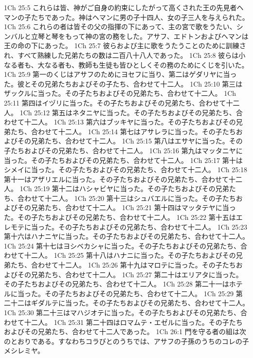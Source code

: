 1Ch 25:5  これらは皆、神がご自身の約束にしたがって高くされた王の先見者ヘマンの子たちであった。神はヘマンに男の子十四人、女の子三人を与えられた。
1Ch 25:6  これらの者は皆その父の指揮の下にあって、主の宮で歌をうたい、シンバルと立琴と琴をもって神の宮の務をした。アサフ、エドトンおよびヘマンは王の命の下にあった。
1Ch 25:7  彼らおよび主に歌をうたうことのために訓練され、すべて熟練した兄弟たちの数は二百八十八人であった。
1Ch 25:8  彼らは小なる者も、大なる者も、教師も生徒も皆ひとしくその務のためにくじを引いた。
1Ch 25:9  第一のくじはアサフのためにヨセフに当り、第二はゲダリヤに当った。彼とその兄弟たちおよびその子たち、合わせて十二人。
1Ch 25:10  第三はザックルに当った。その子たちおよびその兄弟たち、合わせて十二人。
1Ch 25:11  第四はイヅリに当った。その子たちおよびその兄弟たち、合わせて十二人。
1Ch 25:12  第五はネタニヤに当った。その子たちおよびその兄弟たち、合わせて十二人。
1Ch 25:13  第六はブッキヤに当った。その子たちおよびその兄弟たち、合わせて十二人。
1Ch 25:14  第七はアサレラに当った。その子たちおよびその兄弟たち、合わせて十二人。
1Ch 25:15  第八はエサヤに当った。その子たちおよびその兄弟たち、合わせて十二人。
1Ch 25:16  第九はマッタニヤに当った。その子たちおよびその兄弟たち、合わせて十二人。
1Ch 25:17  第十はシメイに当った。その子たちおよびその兄弟たち、合わせて十二人。
1Ch 25:18  第十一はアザリエルに当った。その子たちおよびその兄弟たち、合わせて十二人。
1Ch 25:19  第十二はハシャビヤに当った。その子たちおよびその兄弟たち、合わせて十二人。
1Ch 25:20  第十三はシュバエルに当った。その子たちおよびその兄弟たち、合わせて十二人。
1Ch 25:21  第十四はマッタテヤに当った。その子たちおよびその兄弟たち、合わせて十二人。
1Ch 25:22  第十五はエレモテに当った。その子たちおよびその兄弟たち、合わせて十二人。
1Ch 25:23  第十六はハナニヤに当った。その子たちおよびその兄弟たち、合わせて十二人。
1Ch 25:24  第十七はヨシベカシャに当った。その子たちおよびその兄弟たち、合わせて十二人。
1Ch 25:25  第十八はハナニに当った。その子たちおよびその兄弟たち、合わせて十二人。
1Ch 25:26  第十九はマロテに当った。その子たちおよびその兄弟たち、合わせて十二人。
1Ch 25:27  第二十はエリアタに当った。その子たちおよびその兄弟たち、合わせて十二人。
1Ch 25:28  第二十一はホテルに当った。その子たちおよびその兄弟たち、合わせて十二人。
1Ch 25:29  第二十二はギダルテに当った。その子たちおよびその兄弟たち、合わせて十二人。
1Ch 25:30  第二十三はマハジオテに当った。その子たちおよびその兄弟たち、合わせて十二人。
1Ch 25:31  第二十四はロマムテ・エゼルに当った。その子たちおよびその兄弟たち、合わせて十二人であった。
1Ch 26:1  門を守る者の組は次のとおりである。すなわちコラびとのうちでは、アサフの子孫のうちのコレの子メシレミヤ。

